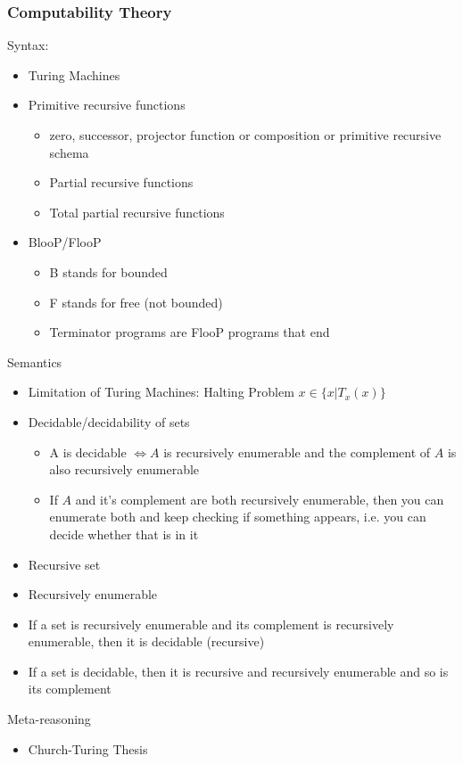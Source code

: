 \documentclass[11pt]{article}
\begin{document}
\subsubsection{Computability Theory}
\label{sec:org81a5045}
Syntax:
\begin{itemize}
\item Turing Machines
\item Primitive recursive functions
\begin{itemize}
\item zero, successor, projector function or composition or primitive recursive schema
\item Partial recursive functions
\item Total partial recursive functions
\end{itemize}
\item BlooP/FlooP
\begin{itemize}
\item B stands for bounded
\item F stands for free (not bounded)
\item Terminator programs are FlooP programs that end
\end{itemize}
\end{itemize}
Semantics
\begin{itemize}
\item Limitation of Turing Machines: Halting Problem \(x \in \{x | T_x(x)\}\)
\item Decidable/decidability of sets
\begin{itemize}
\item A is decidable \(\iff A\) is recursively enumerable and the complement of \(A\) is also recursively enumerable
\item If \(A\) and it's complement are both recursively enumerable, then you can enumerate both and keep checking if something appears, i.e. you can decide whether that is in it
\end{itemize}
\item Recursive set
\item Recursively enumerable
\item If a set is recursively enumerable and its complement is recursively enumerable, then it is decidable (recursive)
\item If a set is decidable, then it is recursive and recursively enumerable and so is its complement
\end{itemize}
Meta-reasoning
\begin{itemize}
\item Church-Turing Thesis
\end{itemize}
\end{document}
